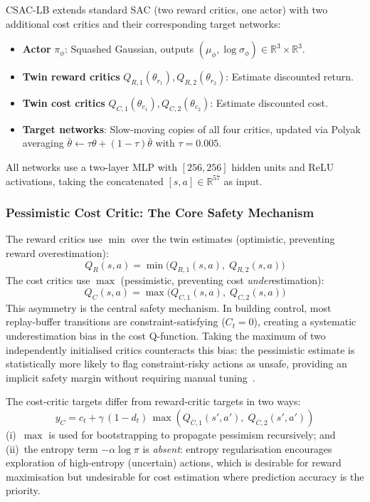 CSAC-LB extends standard SAC (two reward critics, one actor) with two
additional cost critics and their corresponding target networks:
\begin{itemize}
  \item \textbf{Actor} $\pi_\phi$: Squashed Gaussian, outputs
    $(\mu_\phi, \log\sigma_\phi) \in \mathbb{R}^3 \times \mathbb{R}^3$.
  \item \textbf{Twin reward critics} $Q_{R,1}(\theta_{r_1}), Q_{R,2}(\theta_{r_2})$:
    Estimate discounted return.
  \item \textbf{Twin cost critics} $Q_{C,1}(\theta_{c_1}), Q_{C,2}(\theta_{c_2})$:
    Estimate discounted cost.
  \item \textbf{Target networks}: Slow-moving copies of all four critics,
    updated via Polyak averaging $\bar{\theta} \leftarrow \tau\theta +
    (1-\tau)\bar{\theta}$ with $\tau = 0.005$.
\end{itemize}
All networks use a two-layer MLP with $[256, 256]$ hidden units and ReLU
activations, taking the concatenated $[s, a] \in \mathbb{R}^{57}$ as input.

\subsubsection{Pessimistic Cost Critic: The Core Safety Mechanism}

The reward critics use $\min$ over the twin estimates (optimistic, preventing
reward overestimation):
\begin{equation}
  Q_R(s,a) = \min\bigl(Q_{R,1}(s,a),\; Q_{R,2}(s,a)\bigr)
  \label{eq:reward-critic-min}
\end{equation}
The cost critics use \emph{$\max$} (pessimistic, preventing cost
\emph{under}estimation):
\begin{equation}
  Q_C(s,a) = \max\bigl(Q_{C,1}(s,a),\; Q_{C,2}(s,a)\bigr)
  \label{eq:cost-critic-max}
\end{equation}
This asymmetry is the central safety mechanism.  In building control, most
replay-buffer transitions are constraint-satisfying ($C_t = 0$), creating a
systematic underestimation bias in the cost Q-function.  Taking the maximum of
two independently initialised critics counteracts this bias: the pessimistic
estimate is statistically more likely to flag constraint-risky actions as
unsafe, providing an implicit safety margin without requiring manual
tuning~\cite{zhang2024csaclb}.

The cost-critic targets differ from reward-critic targets in two ways:
\begin{equation}
  y_C = c_t + \gamma\,(1 - d_t)\,\max\!\left(
    Q_{\bar{C},1}(s', a'),\; Q_{\bar{C},2}(s', a')
  \right)
  \label{eq:cost-target}
\end{equation}
(i)~$\max$ is used for bootstrapping to propagate pessimism recursively; and
(ii)~the entropy term $-\alpha \log \pi$ is \emph{absent}: entropy
regularisation encourages exploration of high-entropy (uncertain) actions,
which is desirable for reward maximisation but undesirable for cost
estimation where prediction accuracy is the priority.

